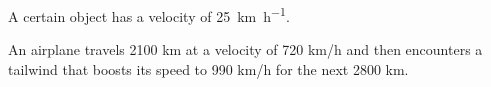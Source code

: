 \documentclass[10pt]{exam}
\begin{document}
\begin{questions}
  \question
    A certain object has a velocity of \SI{25}{\kilo\meter\per\hour}.



\pagebreak

  \question
    An airplane travels 2100 km at a velocity of 720 km/h and then encounters a tailwind that boosts its speed to 990 km/h for the next 2800 km.  



\end{questions}
\end{document}
